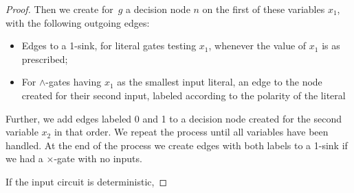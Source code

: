 \begin{proof}
  Then we create for~$g$ a decision node $n$ on the first of these variables
  $x_1$,
  with the following outgoing edges:
  \begin{itemize}
    \item Edges to a 1-sink, for literal gates testing $x_1$, whenever the
      value of $x_1$ is as prescribed;
    \item For $\land$-gates having $x_1$ as the smallest input literal, an edge
      to the node created for their second input, labeled according to the
      polarity of the literal
  \end{itemize}
  Further, we add edges labeled 0 and 1 to a decision node created for the
  second variable $x_2$ in that order. We repeat the process until all
  variables have been handled. At the end of the process we create edges with
both labels to a 1-sink if we had a $\times$-gate with no inputs.


  If the input circuit is deterministic, 
\end{proof}

